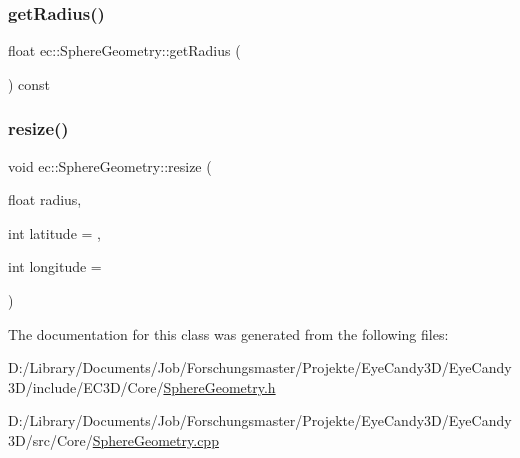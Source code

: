 \mbox{\label{classec_1_1_sphere_geometry_a297fbaec8341dbb2dd0023b0d90d4e24}} 
\subsubsection{\texorpdfstring{get\+Radius()}{getRadius()}}
{\footnotesize\ttfamily float ec\+::\+Sphere\+Geometry\+::get\+Radius (\begin{DoxyParamCaption}{ }\end{DoxyParamCaption}) const}

\mbox{\label{classec_1_1_sphere_geometry_a44eb0096b6f9c6a98a7c325032c04c41}} 
\subsubsection{\texorpdfstring{resize()}{resize()}}
{\footnotesize\ttfamily void ec\+::\+Sphere\+Geometry\+::resize (\begin{DoxyParamCaption}\item[{float}]{radius,  }\item[{int}]{latitude = {},  }\item[{int}]{longitude = {} }\end{DoxyParamCaption})}



The documentation for this class was generated from the following files\+:\begin{DoxyCompactItemize}
\item 
D\+:/\+Library/\+Documents/\+Job/\+Forschungsmaster/\+Projekte/\+Eye\+Candy3\+D/\+Eye\+Candy3\+D/include/\+E\+C3\+D/\+Core/\mbox{\hyperlink{_sphere_geometry_8h}{Sphere\+Geometry.\+h}}\item 
D\+:/\+Library/\+Documents/\+Job/\+Forschungsmaster/\+Projekte/\+Eye\+Candy3\+D/\+Eye\+Candy3\+D/src/\+Core/\mbox{\hyperlink{_sphere_geometry_8cpp}{Sphere\+Geometry.\+cpp}}\end{DoxyCompactItemize}
